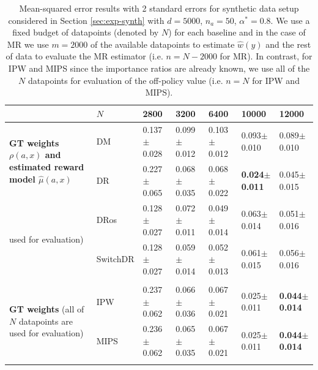 \begin{table}
    \centering
        \caption{Mean-squared error results with 2 standard errors for synthetic data setup considered in Section \ref{sec:exp-synth} with $d=5000$, $n_a = 50$, $\alpha^\ast = 0.8$. We use a fixed budget of datapoints (denoted by $N$) for each baseline and in the case of MR we use $m=2000$ of the available datapoints to estimate $\hat{w}(y)$ and the rest of data to evaluate the MR estimator (i.e. $n = N-2000$ for MR). In contrast, for IPW and MIPS since the importance ratios are already known, we use all of the $N$ datapoints for evaluation of the off-policy value (i.e. $n=N$ for IPW and MIPS).}
    \label{tab:known_ratios}
    \begin{tiny}
    \begin{tabular}{l|llllll}
\toprule
& $N$ & 2800 & 3200 & 6400 & 10000 & 12000 \\
\midrule
\multirow{2}{*}{
\begin{tiny}
\textbf{GT weights $\rho(a, x)$ and estimated reward model $\hat{\mu}(a, x)$}
\end{tiny}}
& DM & 0.137$\pm$0.028 & 0.099$\pm$0.012 & 0.103$\pm$0.012 & 0.093$\pm$0.010 & 0.089$\pm$0.010 \\
\multirow{2}{*}{
\begin{tiny}
($m=2000$ used for training $\hat{\mu}(a, x)$ and $n=N-2000$ 
\end{tiny}}
& DR & 0.227$\pm$0.065 & 0.068$\pm$0.035 & 0.068$\pm$0.022 & \textbf{0.024$\pm$0.011} & 0.045$\pm$0.015 \\
\multirow{2}{*}{
\begin{tiny}
used for evaluation)
\end{tiny}} & DRos & 0.128$\pm$0.027 & 0.072$\pm$0.011 & 0.049$\pm$0.014 & 0.063$\pm$0.014 & 0.051$\pm$0.016 \\
& SwitchDR & 0.128$\pm$0.027 & 0.059$\pm$0.014 & 0.052$\pm$0.013 & 0.061$\pm$0.015 & 0.056$\pm$0.016 \\
\hline
\\
\multirow{2}{*}{
\begin{tiny}
\textbf{GT weights} (all of $N$ datapoints are used for evaluation)
\end{tiny}}
& IPW & 0.237$\pm$0.062 & 0.066$\pm$0.036 & 0.067$\pm$0.021 & 0.025$\pm$0.011 & \textbf{0.044$\pm$0.014} \\
& MIPS & 0.236$\pm$0.062 & 0.065$\pm$0.035 & 0.067$\pm$0.021 & 0.025$\pm$0.011 & \textbf{0.044$\pm$0.014} \\
\hline
\multirow{3}{*}{
}
\end{tabular}
\end{tiny}
\end{table}
